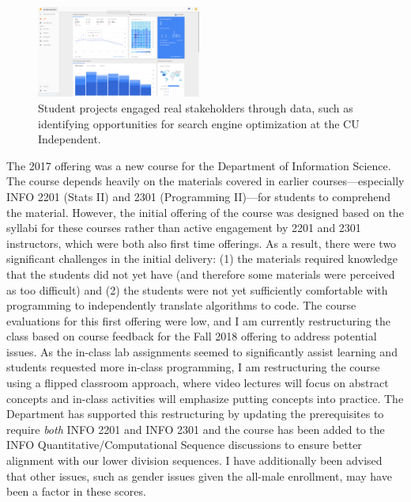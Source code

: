 \documentclass[11pt]{article}
\begin{document}
\begin{figure}
	\begin{center}
		\includegraphics[width=0.48\textwidth]{3401_example}
	\end{center}
	\caption{Student projects engaged real stakeholders through data, such as identifying opportunities for search engine optimization at the CU Independent.}
\end{figure}

The 2017 offering was a new course for the Department of Information Science. The course depends heavily on the materials covered in earlier courses---especially INFO 2201 (Stats II) and 2301 (Programming II)---for students to comprehend the material. However, the initial offering of the course was designed based on the syllabi for these courses rather than active engagement by 2201 and 2301 instructors, which were both also first time offerings. As a result, there were two significant challenges in the initial delivery: (1) the materials required knowledge that the students did not yet have (and therefore some materials were perceived as too difficult) and (2) the students were not yet sufficiently comfortable with programming to independently translate algorithms to code.
The course evaluations for this first offering were low, and I am currently restructuring the class based on course feedback for the Fall 2018 offering to address potential issues. As the in-class lab assignments seemed to significantly assist learning and students requested more in-class programming, I am restructuring the course using a flipped classroom approach, where video lectures will focus on abstract concepts and in-class activities will emphasize putting concepts into practice. The Department has supported this restructuring by updating the prerequisites to require \emph{both} INFO 2201 and INFO 2301 and the course has been added to the INFO Quantitative/Computational Sequence discussions to ensure better alignment with our lower division sequences. I have additionally been advised that other issues, such as gender issues given the all-male enrollment, may have been a factor in these scores. 
\end{document}

